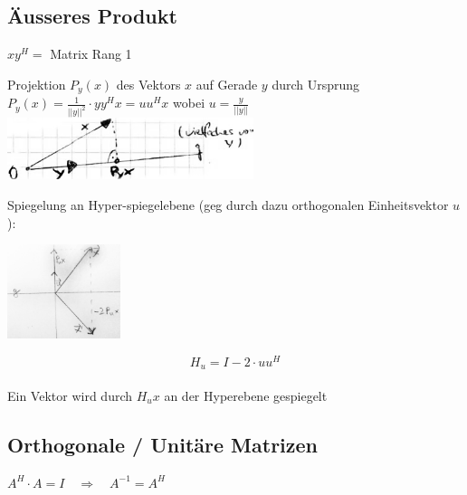 \documentclass[a4paper,twocolumn]{article}
\begin{document}
	\subsection{Äusseres Produkt}
	
		\begin{fdef}
			$xy^H = $ Matrix Rang 1
		\end{fdef}
		
		\begin{fsatz}
			Projektion $P_y(x)$ des Vektors $x$ auf Gerade $y$ durch Ursprung\\
			$P_y(x) = \frac{1}{{||y||}^2} \cdot yy^H x = uu^Hx$ wobei $u = \frac{y}{||y||}$\\
			\includegraphics[width=7.2cm]{ortho_projektion} 
		\end{fsatz}

		\begin{fdef}
			Spiegelung an Hyper-spiegelebene (geg durch dazu orthogonalen Einheitsvektor $u$):\\[-5mm]
			\begin{floatingfigure}[p]{3.4cm}
				\includegraphics[width=3.3cm]{householder}
			\end{floatingfigure}
			$$H_u = I -  2 \cdot u u^H$$\\[-5mm]

			Ein Vektor wird durch $H_u x$ an der Hyperebene gespiegelt
			\vspace{8mm}
		\end{fdef}
		

		
	\subsection{Orthogonale / Unitäre Matrizen}
		
		\begin{fdef}
			$A^H\cdot A = I \quad \Rightarrow \quad A^{-1} = A^H$ 
		\end{fdef}
		
\end{document}
